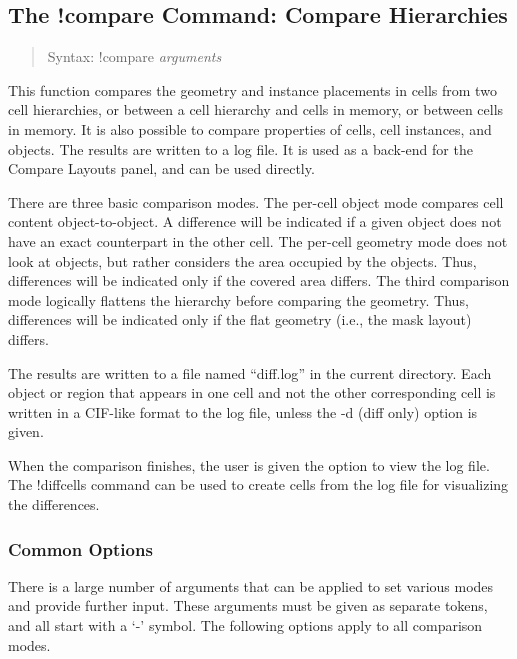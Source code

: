 \subsection{The {\cb !compare} Command: Compare Hierarchies}
\label{cellcomp}
\begin{quote}
Syntax: {\vt !compare} {\it arguments}
\end{quote}
This function compares the geometry and instance placements in cells
from two cell hierarchies, or between a cell hierarchy and cells in
memory, or between cells in memory.  It is also possible to compare
properties of cells, cell instances, and objects.  The results are
written to a log file.  It is used as a back-end for the {\cb Compare
Layouts} panel, and can be used directly.

There are three basic comparison modes.  The per-cell object mode
compares cell content object-to-object.  A difference will be
indicated if a given object does not have an exact counterpart in the
other cell.  The per-cell geometry mode does not look at objects, but
rather considers the area occupied by the objects.  Thus, differences
will be indicated only if the covered area differs.  The third
comparison mode logically flattens the hierarchy before comparing the
geometry.  Thus, differences will be indicated only if the flat
geometry (i.e., the mask layout) differs.

The results are written to a file named ``{\vt diff.log}'' in the
current directory.  Each object or region that appears in one cell and
not the other corresponding cell is written in a CIF-like format to
the log file, unless the {\vt -d} (diff only) option is given.

When the comparison finishes, the user is given the option to view the
log file.  The {\cb !diffcells} command can be used to create cells
from the log file for visualizing the differences.

\subsubsection{Common Options}

There is a large number of arguments that can be applied to set
various modes and provide further input.  These arguments must be
given as separate tokens, and all start with a `{\vt -}' symbol.  The
following options apply to all comparison modes.

